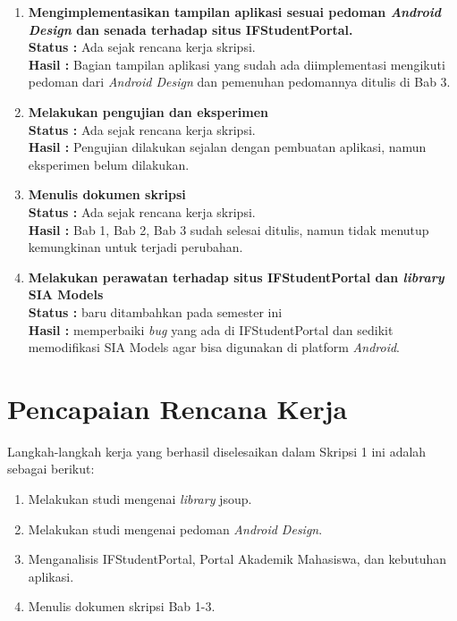 \documentclass[a4paper,twoside]{article}
\begin{document}
\begin{enumerate}
		\item \textbf{Mengimplementasikan tampilan aplikasi sesuai pedoman \textit{Android Design} dan senada terhadap situs IFStudentPortal.}\\
		{\bf Status :} Ada sejak rencana kerja skripsi. \\
		{\bf Hasil :} Bagian tampilan aplikasi yang sudah ada diimplementasi mengikuti pedoman dari \textit{Android Design} dan pemenuhan pedomannya ditulis di Bab 3.

		\item \textbf{Melakukan pengujian dan eksperimen} \\
		{\bf Status :} Ada sejak rencana kerja skripsi.\\
		{\bf Hasil :} Pengujian dilakukan sejalan dengan pembuatan aplikasi, namun eksperimen belum dilakukan.

		\item \textbf{Menulis dokumen skripsi}\\
		{\bf Status :} Ada sejak rencana kerja skripsi.\\
		{\bf Hasil :} Bab 1, Bab 2, Bab 3 sudah selesai ditulis, namun tidak menutup kemungkinan untuk terjadi perubahan.
		
		\item \textbf{Melakukan perawatan terhadap situs IFStudentPortal dan \textit{library} SIA Models}\\
		{\bf Status :} baru ditambahkan pada semester ini\\
		{\bf Hasil :} memperbaiki \textit{bug} yang ada di IFStudentPortal dan sedikit memodifikasi SIA Models agar bisa digunakan di platform \textit{Android}. 
	\end{enumerate}

\section{Pencapaian Rencana Kerja}
Langkah-langkah kerja yang berhasil diselesaikan dalam Skripsi 1 ini adalah sebagai berikut:
\begin{enumerate}
\item Melakukan studi mengenai \textit{library} jsoup.
\item Melakukan studi mengenai pedoman \textit{Android Design}.
\item Menganalisis IFStudentPortal, Portal Akademik Mahasiswa, dan kebutuhan aplikasi.
\item Menulis dokumen skripsi Bab 1-3.
\end{enumerate}
\end{document}
